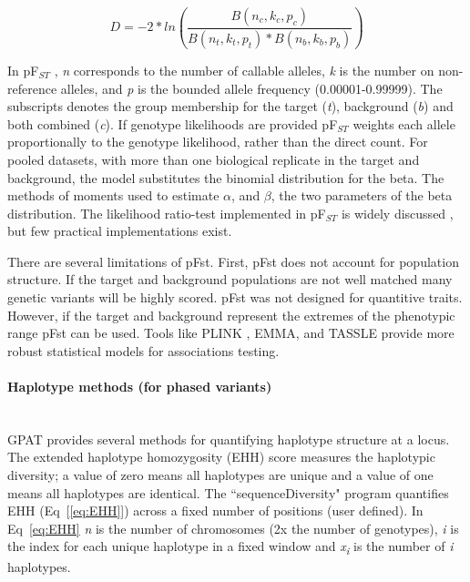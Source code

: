 \documentclass[10pt,letterpaper]{article}
\begin{document}
\begin{equation}\label{eq:pfst} 
D=-2* ln (\frac{ B(n_c,k_c,p_c) }{ B(n_t,k_t,p_t)*B(n_b,k_b,p_b)  })
\end{equation}

In pF$_{ST}$ , \textit{n} corresponds to the number of callable alleles, \textit{k} is the number on non-reference alleles, and \textit{p} is the bounded allele frequency (0.00001-0.99999).  The subscripts denotes the group membership for the target (\textit{t}), background (\textit{b}) and both combined (\textit{c}).  If genotype likelihoods are provided pF$_{ST}$  weights each allele proportionally to the genotype likelihood, rather than the direct count.   For pooled datasets, with more than one biological replicate in the target and background, the model substitutes the binomial distribution for the beta.  The methods of moments used to estimate $\alpha$, and $\beta$, the two parameters of the beta distribution.  The likelihood ratio-test implemented in pF$_{ST}$ is widely discussed \cite{kim,heng}, but few practical implementations exist.  

There are several limitations of pFst.  First, pFst does not account for population structure.  If the target and background populations are not well matched many genetic variants will be highly scored.  pFst was not designed for quantitive traits.  However, if the target and background represent the extremes of the phenotypic range pFst can be used.  Tools like PLINK \cite{plink}, EMMA\cite{emma}, and TASSLE\cite{tassel} provide more robust statistical models for associations testing.

\paragraph*{Haplotype methods (for phased variants) }\mbox{} \\

GPAT provides several methods for quantifying haplotype structure at a locus.  The extended haplotype homozygosity (EHH) score measures the haplotypic diversity; a value of zero means all haplotypes are unique and a value of one means all haplotypes are identical. The ``sequenceDiversity" program quantifies EHH (Eq~[\ref{eq:EHH}]) across a fixed number of positions (user defined). In Eq~\ref{eq:EHH} \textit{n} is the number of chromosomes (2x the number of genotypes), \textit{i} is the index for each unique haplotype in a fixed window and \textit{x\textsubscript{i}} is the number of \textit{i} haplotypes.  
\end{document}
